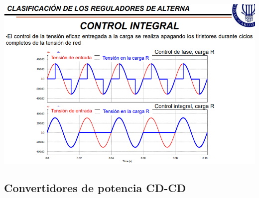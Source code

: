 \documentclass[12pt,a4paper]{article}
\begin{document}
\begin{center}
\includegraphics[scale=0.8]{imagenes/cacare4.PNG}
\end{center}
\newpage
\begin{center}
\section{Convertidores de potencia CD-CD}
\end{center}
\end{document}
